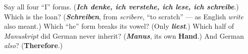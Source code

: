 \begin{tcolorbox}[breakable,colback=teal!4,colframe=teal!35!black,title={Before you move on}]
Say all four \textquotedblleft{}I\textquotedblright{} forms. (\emph{\textbf{Ich denke, ich verstehe, ich lese, ich schreibe}}.) Which is the loan? (\emph{\textbf{Schreiben}}, from \emph{scrībere}, \textquotedblleft{}to scratch\textquotedblright{} — as English \emph{write} also meant.) Which \textquotedblleft{}he\textquotedblright{} form breaks its vowel? (Only \emph{\textbf{liest}}.) Which half of \emph{Manuskript} did German never inherit? (\emph{\textbf{Manus}}, its own \textbf{Hand}.) And German \emph{also}? (\textbf{Therefore}.)
\end{tcolorbox}
